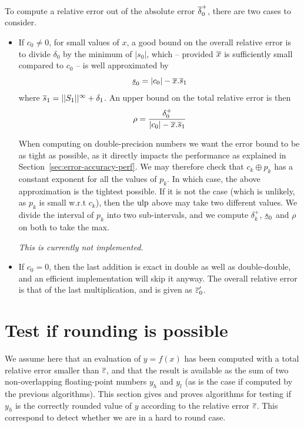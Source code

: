   To compute a  relative error out of the absolute error
  ${\overline{\delta}}^+_0$, there are two cases to consider.
\begin{itemize}
\item If $c_0\ne 0$, for small values of $x$, a good bound on the
  overall relative error is to divide $\delta_0$ by the minimum of
  $|s_0|$, which -- provided ${\overline{x}}$ is sufficiently small compared to
  $c_0$ -- is well approximated by
  $$\underline{s}_{0}=|c_0| - {\overline{x}} . \overline{s}_{1}$$ 
  where $\overline{s}_{1}=||{S_1}||^{\infty} + \delta_1$.
  An upper bound on the total
  relative error is then
  $$\rho = \frac{\delta^+_0}{|c_0| - {\overline{x}} . \overline{s}_{1}}$$
  
  When computing on double-precision numbers we want the error bound
  to be as tight as possible, as it directly impacts the performance
  as explained in Section~\ref{sec:error-accuracy-perf}. We may
  therefore check that $c_k \oplus p_k$ has a constant exponent for
  all the values of $p_k$. In which case, the above approximation is
  the tightest possible. If it is not the case (which is unlikely, as
  $p_k$ is small w.r.t $c_k$), then the $\mbox{ulp}$ above may take two
  different values. We divide the interval of $p_k$ into two
  sub-intervals, and we compute $\delta^+_k$, $\underline{s}_{0}$ and $\rho$ on
  both to take the max.
  
\emph{This is currently not implemented.}

\item If $c_0=0$, then the last addition is exact in double as well as
  double-double, and an efficient implementation will skip it anyway.
  The overall relative error is that of the last multiplication, and is given as ${\overline{\varepsilon}}'_0$.
\end{itemize}



\section{Test if rounding is possible
\label{section:testrounding}}

We assume here that an evaluation of $y=f(x)$ has been computed with a
total relative error smaller than ${\overline{\varepsilon}}$, and that the result is
available as the sum of two non-overlapping floating-point numbers
$y_h$ and $y_l$ (as is the case if computed by the previous
algorithms). This section gives and proves algorithms for testing if
$y_h$ is the correctly rounded value of $y$ according to the relative
error ${\overline{\varepsilon}}$. This correspond to detect whether we are in a hard
to round case.





